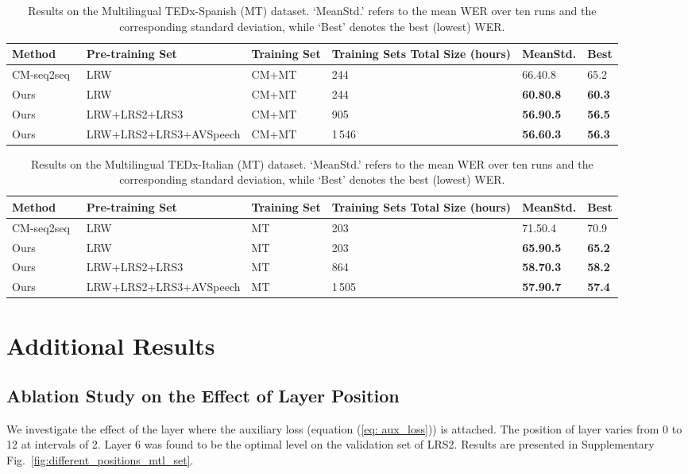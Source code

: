 \documentclass[twocolumn]{article}
\begin{document}
\begin{table*}[!t]
\centering
\caption{Results on the Multilingual TEDx-Spanish (MT) dataset. `MeanStd.' refers to the mean WER over ten runs and the corresponding standard deviation, while `Best' denotes the best (lowest) WER.}
\renewcommand\arraystretch{1.4}
\begin{tabularx}{2\columnwidth}{j v k o y y}
\toprule
Method &Pre-training Set &Training Set &Training Sets Total Size (hours) &MeanStd. &Best \\
\midrule
CM-seq2seq~\cite{DBLP:journals/corr/abs-2102-06657} &LRW &CM+MT &244 & 66.40.8 & 65.2 \\
\midrule
Ours &LRW &CM+MT &244 &\bf 60.80.8 &\bf 60.3 \\
\midrule
Ours &LRW+LRS2+LRS3 &CM+MT &905 &\bf 56.90.5 &\bf 56.5 \\
\midrule
Ours &LRW+LRS2+LRS3+AVSpeech &CM+MT &1\,546 &\bf 56.60.3 &\bf 56.3 \\
\bottomrule
\end{tabularx}
\label{tab: supplemental_MTspanish_results}
\end{table*} \begin{table*}[!t]
\centering
\caption{Results on the Multilingual TEDx-Italian (MT) dataset. `MeanStd.' refers to the mean WER over ten runs and the corresponding standard deviation, while `Best' denotes the best (lowest) WER.}
\renewcommand\arraystretch{1.4}
\begin{tabularx}{2\columnwidth}{j v k o y y}
\toprule
Method &Pre-training Set &Training Set &Training Sets Total Size (hours) &MeanStd. &Best \\
\midrule
CM-seq2seq~\cite{DBLP:journals/corr/abs-2102-06657} &LRW &MT &203 & 71.50.4 & 70.9 \\
\midrule
Ours &LRW &MT &203 &\bf 65.90.5 &\bf 65.2 \\
\midrule
Ours &LRW+LRS2+LRS3 &MT &864 &\bf 58.70.3 &\bf 58.2 \\
\midrule
Ours &LRW+LRS2+LRS3+AVSpeech &MT &1\,505 &\bf 57.90.7 &\bf 57.4 \\
\bottomrule
\end{tabularx}
\label{tab: supplemental_MTitalian_results}
\end{table*} 
\section{Additional Results}
\label{sec:SI_Addtional_Results}
\subsection{Ablation Study on the Effect of Layer Position}
\label{ssec:SI_Ablation_layer_position}
We investigate the effect of the layer  where the auxiliary loss (equation (\ref{eq: aux_loss})) is attached. The position of layer varies from 0 to 12 at intervals of 2. Layer 6 was found to be the optimal level on the validation set of LRS2. Results are presented in Supplementary Fig.~\ref{fig:different_positions_mtl_set}.
\end{document}
